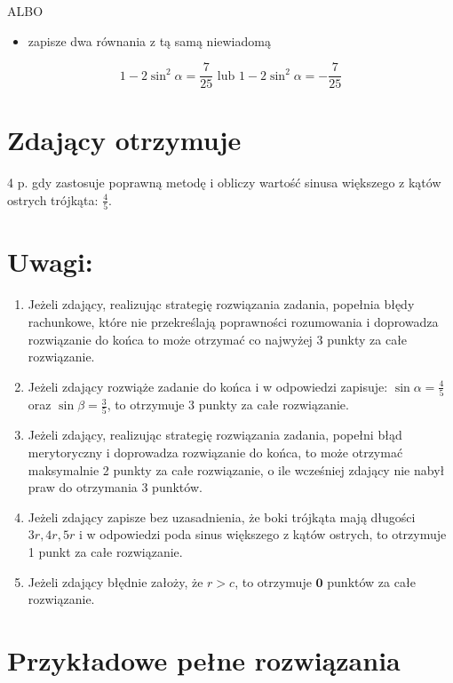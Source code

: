 \documentclass[10pt]{article}
\begin{document}
ALBO

\begin{itemize}
  \item zapisze dwa równania z tą samą niewiadomą
\end{itemize}

$$
1-2 \sin ^{2} \alpha=\frac{7}{25} \text { lub } 1-2 \sin ^{2} \alpha=-\frac{7}{25}
$$

\section*{Zdający otrzymuje}
 4 p. gdy zastosuje poprawną metodę i obliczy wartość sinusa większego z kątów ostrych trójkąta: $\frac{4}{5}$.\section*{Uwagi:}
\begin{enumerate}
  \item Jeżeli zdający, realizując strategię rozwiązania zadania, popełnia błędy rachunkowe, które nie przekreślają poprawności rozumowania i doprowadza rozwiązanie do końca to może otrzymać co najwyżej 3 punkty za całe rozwiązanie.
  \item Jeżeli zdający rozwiąże zadanie do końca i w odpowiedzi zapisuje: $\sin \alpha=\frac{4}{5}$ oraz $\sin \beta=\frac{3}{5}$, to otrzymuje 3 punkty za całe rozwiązanie.
  \item Jeżeli zdający, realizując strategię rozwiązania zadania, popełni błąd merytoryczny i doprowadza rozwiązanie do końca, to może otrzymać maksymalnie 2 punkty za całe rozwiązanie, o ile wcześniej zdający nie nabył praw do otrzymania 3 punktów.
  \item Jeżeli zdający zapisze bez uzasadnienia, że boki trójkąta mają długości $3 r, 4 r, 5 r$ i w odpowiedzi poda sinus większego z kątów ostrych, to otrzymuje 1 punkt za całe rozwiązanie.
  \item Jeżeli zdający błędnie założy, że $r>c$, to otrzymuje $\mathbf{0}$ punktów za całe rozwiązanie.
\end{enumerate}

\section*{Przykładowe pełne rozwiązania}
\end{document}

